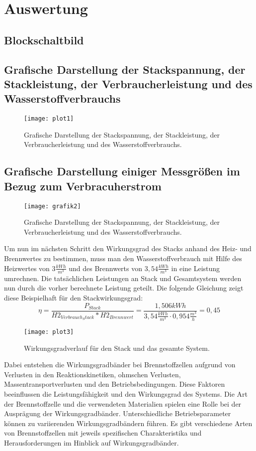 \section{Auswertung}
\label{sec:Auswertung}


\subsection{Blockschaltbild}
\subsection{Grafische Darstellung der Stackspannung, der
Stackleistung, der Verbraucherleistung und des Wasserstoffverbrauchs}
\begin{figure}[H]
    \centering
    \texttt{[image: plot1]}
    \caption{Grafische Darstellung der Stackspannung, der
    Stackleistung, der Verbraucherleistung und des Wasserstoffverbrauchs.}
    \label{fig:plot1_26062023}
  \end{figure}
\subsection{Grafische Darstellung einiger Messgrößen im Bezug zum Verbracuherstrom}
\begin{figure}[H]
    \centering
    \texttt{[image: grafik2]}
    \caption{Grafische Darstellung der Stackspannung, der
    Stackleistung, der Verbraucherleistung und des Wasserstoffverbrauchs.}
    \label{fig:plot2_26062023}
  \end{figure}
  Um nun im nächsten Schritt den Wirkungsgrad des Stacks anhand des Heiz- und Brennwertes zu bestimmen, muss man den Wasserstoffverbrauch mit Hilfe des Heizwertes von $3 \frac{kWh}{m^3}$ und des Brennwerts von $3,54 \frac{kWh}{m^3}$ in eine Leistung umrechnen. Die tatsächlichen Leistungen an Stack und Gesamtsystem werden nun durch die vorher berechnete Leistung geteilt. Die folgende Gleichung zeigt diese Beispielhaft für den Stackwirkungsgrad:
\begin{equation}
 \eta= \frac{P_{Stack}}{H2_{Verbrauch_Stack}*H2_{Brennwert}}= \frac{1,506 kWh}{3,54 \frac{kWh}{m^3 }\cdot 0,954 \frac{m^3}{h}}=0,45
  \label{eq:230627_Beispiel_wirkungsgrad_Berechnung}
\end{equation}
\begin{figure}[H]
    \centering
    \texttt{[image: plot3]}
    \caption{Wirkungsgradverlauf für den Stack und das gesamte System.}
    \label{fig:plot3_26062023}
  \end{figure}
  Dabei entstehen die Wirkungsgradbänder bei Brennstoffzellen aufgrund von Verlusten in den Reaktionskinetiken, ohmschen Verlusten, Massentransportverlusten und den Betriebsbedingungen. Diese Faktoren beeinflussen die Leistungsfähigkeit und den Wirkungsgrad des Systems.
   Die Art der Brennstoffzelle und die verwendeten Materialien spielen eine Rolle bei der Ausprägung der Wirkungsgradbänder. Unterschiedliche Betriebsparameter können zu variierenden Wirkungsgradbändern führen. Es gibt verschiedene Arten von Brennstoffzellen mit jeweils spezifischen Charakteristika und Herausforderungen im Hinblick auf Wirkungsgradbänder.
